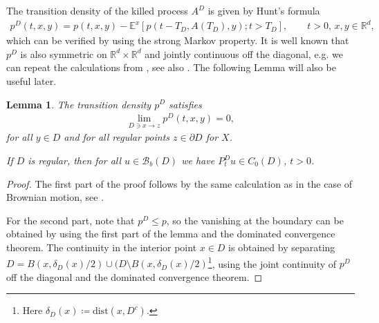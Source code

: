 \documentclass[reqno]{amsart}
\newtheorem{lemma}[theorem]{Lemma}
\theoremstyle{remark}
\numberwithin{equation}{section} %
\newcommand{\BB}{\mathcal{B}}
\newcommand{\dist}{\text{dist}}
\newcommand{\de}{\delta_D}
\newcommand{\1}{\mathds{1}}
\begin{document}
	The transition density of the killed process $A^D$ is given by Hunt's formula
	\begin{align}\label{eq:trans density KSBM}
		p^D(t,x,y)=p(t,x,y)-\mathds{E}^x[p(t-T_D,A({T_D}),y);{t>T_D}], \qquad t>0,\, x,y\in\mathbb{R}^d,
	\end{align}
	which can be verified by using the strong Markov property. It is well known that $p^D$ is also symmetric on $\mathbb{R}^d\times \mathbb{R}^d$ and jointly continuous off the diagonal, e.g. we can repeat the calculations from \cite[Theorem 2.4]{chung_zhao}, see also \cite[Lemma 2]{Chung-DoublyFeller-Seminar85}. The following Lemma will also be useful later.
	\begin{lemma}\label{l:ap:Pt in C0}
		The transition density $p^D$ satisfies
		\begin{align}
			\lim_{D\ni x\to z}p^D(t,x,y)=0,
		\end{align}
		for all $y\in D$ and for all regular points $z\in \partial D$ for $X$.
		
		If $D$ is regular, then for all $u\in \BB_b(D)$ we have $ P^D_tu\in C_0(D)$, $t>0$.
	\end{lemma}
	\begin{proof}
		The first part of the proof follows by the same calculation as in the case of Brownian motion, see \cite[Theorem 2.4]{chung_zhao}.
		
		For the second part, note that $p^D\le p$, so the vanishing at the boundary can be obtained by using the first part of the lemma and the dominated convergence theorem. The continuity in the interior point $x\in D$ is obtained by separating $D=B(x,\de(x)/2)\cup (D\setminus B(x,\de(x)/2)$\footnote{Here $\de(x)\coloneqq \dist(x,D^c)$.}, using the joint continuity of $p^D$ off the diagonal and the dominated convergence theorem.
	\end{proof}
	
\end{document}
